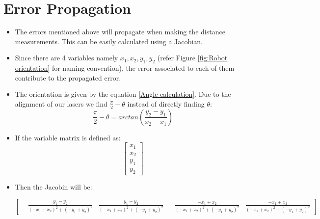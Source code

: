     \section{Error Propagation}
    {
        \begin{itemize}
            \item The errors mentioned above will propagate when making the distance measurements. This can be easily calculated using a Jacobian.
            
            \item Since there are 4 variables namely $x_1,x_2,y_1,y_2$ (refer Figure \ref{fig:Robot orientation} for naming convention), the error associated to each of them contribute to the propagated error.
            
            \item The orientation is given by the equation \ref{Angle calculation}. Due to the alignment of our lasers we find $\frac{\pi}{2}-\theta$ instead of directly finding $\theta$:
            \begin{equation}\label{Angle calculation}
                \frac{\pi}{2}-\theta=arctan(\frac{y_2-y_1}{x_2-x_1})
            \end{equation}
            
            \item If the variable matrix is defined as:
            \begin{equation}\label{Variable Matrix}
                \begin{bmatrix}x_{1}\\x_{2}\\y_{1}\\y_{2}\end{bmatrix}
            \end{equation}
            
            \item Then the Jacobin will be:
          
            
            
           $$ \begin{bmatrix}\label{Jacobian}- \frac{y_{1} - y_{2}}{\left(- x_{1} + x_{2}\right)^{2} + \left(- y_{1} + y_{2}\right)^{2}} & \frac{y_{1} - y_{2}}{\left(- x_{1} + x_{2}\right)^{2} + \left(- y_{1} + y_{2}\right)^{2}} & - \frac{- x_{1} + x_{2}}{\left(- x_{1} + x_{2}\right)^{2} + \left(- y_{1} + y_{2}\right)^{2}} & \frac{- x_{1} + x_{2}}{\left(- x_{1} + x_{2}\right)^{2} + \left(- y_{1} + y_{2}\right)^{2}}\end{bmatrix}
           $$
           

\end{itemize}}
